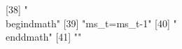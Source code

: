 [38] "\\begin{dmath}"                                                                                                                                                                                                                        
[39] "{ms_{t}}={ms_{t-1}}"                                                                                                                                                                                                                   
[40] "\\end{dmath}"                                                                                                                                                                                                                          
[41] ""                                                                                                                                                                                                                                      
